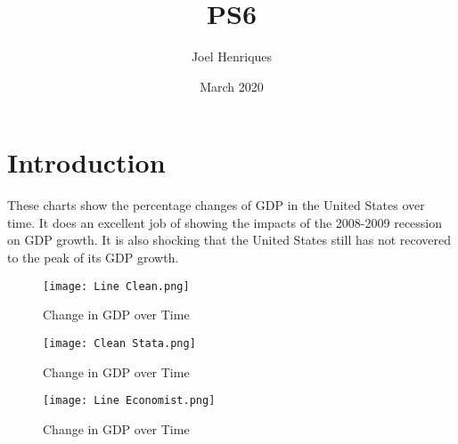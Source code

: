 \documentclass{article}
\title{PS6}
\author{Joel Henriques }
\date{March 2020}
\begin{document}
\maketitle

\section{Introduction}
These charts show the percentage changes of GDP in the United States over time. It does an excellent job of showing the impacts of the 2008-2009 recession on GDP growth. It is also shocking that the United States still has not recovered to the peak of its GDP growth. 

\begin{figure}[hbt!]
\centering
\texttt{[image: Line Clean.png]}
\caption{Change in GDP over Time}
\label{fig1:Line Clean}


\texttt{[image: Clean Stata.png]}
\caption{Change in GDP over Time}
\label{fig2:Clean Stata}


\texttt{[image: Line Economist.png]}
\caption{Change in GDP over Time}
\label{fig2:Line Economist}
\end{figure}
\end{document}
